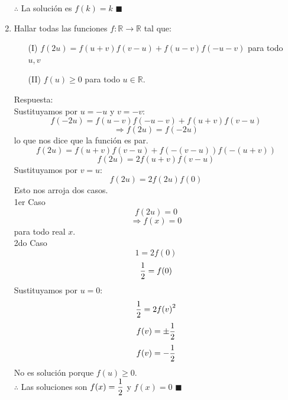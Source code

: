 \documentclass{book}
\newcommand{\R}{\mathbb{R}} \newcommand{\N}{\mathbb{N}}
\begin{document}
\begin{enumerate}
          $\therefore$ La solución es $f(k)=k$ $\blacksquare$\\
    \item Hallar todas las funciones $f:\R\rightarrow\R$   tal que:
          \begin{enumerate}
              \item[(I)] $f(2u) = f(u+v)f(v-u) + f(u-v)f(-u-v)$ para todo $u,v$
                  \item[(II)]$f(u) \geq  0$ para todo $u\in \R$.
          \end{enumerate}
          Respuesta:\\
          Sustituyamos por $u=-u$ y $v=-v$:
          $$f(-2u)=f(u-v)f(-u-v)+ f(u + v)f(v - u)$$
          $$\Rightarrow f(2u)=f(-2u)$$
          lo que nos dice que la función es par.
          $$f(2u) = f(u + v)f(v -u) + f(-(v-u))f(-(u+v))$$
          $$f(2u) = 2f(u + v)f(v -u)$$
          Sustituyamos por $v=u$:
          $$f(2u) = 2f(2u)f(0)$$
          Esto nos arroja dos casos.\\
          1er Caso
          $$f(2u) =0$$
          $$\Rightarrow f(x)=0$$
          para todo real $x$.\\
          2do Caso
          $$1 = 2f(0)$$
          $${1\over 2}  = f(0)$$
          Sustituyamos por $u=0$:
          $${1\over 2}= 2{f(v)}^2$$
          $$f(v)=\pm{1\over 2}$$
          $$f(v)=-{1\over 2}$$
          No es solución porque $f(u)\geq  0$.\\
          $\therefore$ Las soluciones son $\displaystyle{f(x)={1\over 2}}$ y $f(x)=0$ $\blacksquare$\\
          

\end{enumerate}
\end{document}
